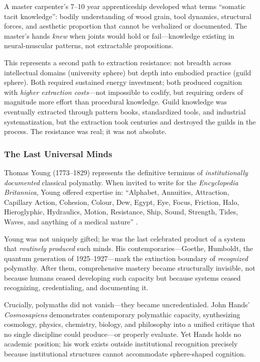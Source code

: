 A master carpenter's 7--10 year apprenticeship developed what \citet{collins2010} terms ``somatic tacit knowledge'': bodily understanding of wood grain, tool dynamics, structural forces, and aesthetic proportion that cannot be verbalized or documented. The master's hands \textit{knew} when joints would hold or fail---knowledge existing in neural-muscular patterns, not extractable propositions.

This represents a second path to extraction resistance: not breadth across intellectual domains (university sphere) but depth into embodied practice (guild sphere). Both required sustained energy investment; both produced cognition with \textit{higher extraction costs}---not impossible to codify, but requiring orders of magnitude more effort than procedural knowledge. Guild knowledge was eventually extracted through pattern books, standardized tools, and industrial systematization, but the extraction took centuries and destroyed the guilds in the process. The resistance was real; it was not absolute.

\subsubsection{The Last Universal Minds}

Thomas Young (1773--1829) represents the definitive terminus of \textit{institutionally documented} classical polymathy. When invited to write for the \textit{Encyclopedia Britannica}, Young offered expertise in: ``Alphabet, Annuities, Attraction, Capillary Action, Cohesion, Colour, Dew, Egypt, Eye, Focus, Friction, Halo, Hieroglyphic, Hydraulics, Motion, Resistance, Ship, Sound, Strength, Tides, Waves, and anything of a medical nature'' \citep{robinson2006}.

Young was not uniquely gifted; he was the last celebrated product of a system that \textit{routinely produced} such minds. His contemporaries---Goethe, Humboldt, the quantum generation of 1925--1927---mark the extinction boundary of \textit{recognized} polymathy. After them, comprehensive mastery became structurally invisible, not because humans ceased developing such capacity but because systems ceased recognizing, credentialing, and documenting it.

Crucially, polymaths did not vanish---they became uncredentialed. John Hands' \textit{Cosmosapiens} \citeyearpar{hands2015} demonstrates contemporary polymathic capacity, synthesizing cosmology, physics, chemistry, biology, and philosophy into a unified critique that no single discipline could produce---or properly evaluate. Yet Hands holds no academic position; his work exists outside institutional recognition precisely because institutional structures cannot accommodate sphere-shaped cognition.

